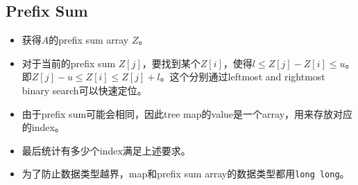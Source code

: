 \subsection{Prefix Sum}
\begin{itemize}
\item 获得$A$的prefix sum array $Z$。
\item 对于当前的prefix sum $Z[j]$，要找到某个$Z[i]$，使得$l\leq Z[j]-Z[i]\leq u$。即$Z[j]-u\leq Z[i]\leq Z[j]+l$。这个分别通过leftmost and rightmost binary search可以快速定位。
\item 由于prefix sum可能会相同，因此tree map的value是一个array，用来存放对应的index。
\item 最后统计有多少个index满足上述要求。
\item 为了防止数据类型越界，map和prefix sum array的数据类型都用\texttt{long long}。
\end{itemize}
\setcounter{lstlisting}{0}
